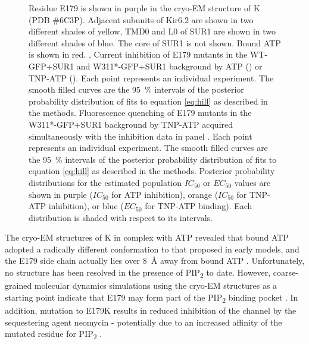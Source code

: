 \begin{figure}[h]
\begin{subfigure}[t]{0.9\textwidth}
	\end{subfigure}
	\caption[Functional effects of E179 mutations]{
	 Residue E179 is shown in purple in the cryo-EM structure of K\ATP{} (PDB \#6C3P).
	Adjacent subunits of Kir6.2 are shown in two different shades of yellow, TMD0 and L0 of SUR1 are shown in two different shades of blue.
	The core of SUR1 is not shown.
	Bound ATP is shown in red.
	,  Current inhibition of E179 mutants in the WT-GFP+SUR1 and W311*-GFP+SUR1 background by ATP () or TNP-ATP ().
	Each point represents an individual experiment.
	The smooth filled curves are the \SI{95}{\percent} intervals of the posterior probability distribution of fits to equation \ref{eq:hill} as described in the methods.
	 Fluorescence quenching of E179 mutants in the W311*-GFP+SUR1 background by TNP-ATP acquired simultaneously with the inhibition data in panel .
	Each point represents an individual experiment.
	The smooth filled curves are the \SI{95}{\percent} intervals of the posterior probability distribution of fits to equation \ref{eq:hill} as described in the methods.
	 Posterior probability distributions for the estimated population $IC_{50}$ or $EC_{50}$ values are shown in purple ($IC_{50}$ for ATP inhibition), orange ($IC_{50}$ for TNP-ATP inhibition), or blue ($EC_{50}$ for TNP-ATP binding).
	Each distribution is shaded with respect to its intervals.
	}\label{ch5fig:e179_1}
\end{figure}

The cryo-EM structures of K\ATP{} in complex with ATP revealed that bound ATP adopted a radically different conformation to that proposed in early models, and the E179 side chain actually lies over \SI{8}{\angstrom} away from bound ATP \cite{lee_molecular_2017, martin_anti-diabetic_2017, li_structure_2017, puljung_cryo-electron_2018-1}.
Unfortunately, no structure has been resolved in the presence of PIP\textsubscript{2} to date.
However, coarse-grained molecular dynamics simulations using the cryo-EM structures as a starting point indicate that E179 may form part of the PIP\textsubscript{2} binding pocket \cite{pipatpolkai_evaluating_2020}.
In addition, mutation to E179K results in reduced inhibition of the channel by the sequestering agent neomycin - potentially due to an increased affinity of the mutated residue for PIP\textsubscript{2} \cite{pipatpolkai_evaluating_2020}.

